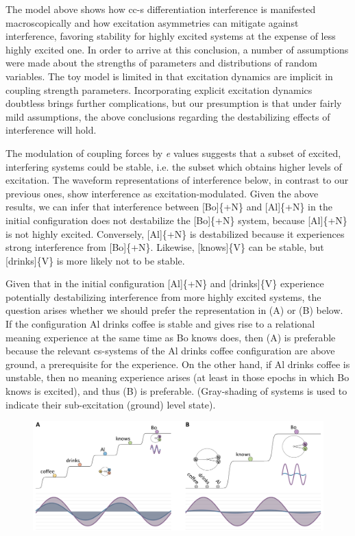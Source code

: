 The model above shows how cc-s differentiation interference is manifested macroscopically and how excitation asymmetries can mitigate against interference, favoring stability for highly excited systems at the expense of less highly excited one. In order to arrive at this conclusion, a number of assumptions were made about the strengths of parameters and distributions of random variables. The toy model is limited in that excitation dynamics are implicit in coupling strength parameters. Incorporating explicit excitation dynamics doubtless brings further complications, but our presumption is that under fairly mild assumptions, the above conclusions regarding the destabilizing effects of interference will hold.

  The modulation of coupling forces by \textit{e} values suggests that a subset of excited, interfering systems could be stable, i.e. the subset which obtains higher levels of excitation. The waveform representations of interference below, in contrast to our previous ones, show interference as excitation-modulated. Given the above results, we can infer that interference between [Bo]\{+N\} and [Al]\{+N\} in the initial configuration does not destabilize the [Bo]\{+N\} system, because [Al]\{+N\} is not highly excited. Conversely, [Al]\{+N\} is destabilized because it experiences strong interference from [Bo]\{+N\}. Likewise, [knows]\{V\} can be stable,  but [drinks]\{V\} is more likely not to be stable. 

  Given that in the initial configuration [Al]\{+N\} and [drinks]\{V\} experience potentially destabilizing interference from more highly excited systems, the question arises whether we should prefer the representation in (A) or (B) below. If the configuration {\textbar}Al drinks coffee{\textbar} is stable and gives rise to a relational meaning experience at the same time as {\textbar}Bo knows{\textbar} does, then (A) is preferable because the relevant cs-systems of the {\textbar}Al drinks coffee{\textbar} configuration are above ground, a prerequisite for the experience. On the other hand, if {\textbar}Al drinks coffee{\textbar} is unstable, then no meaning experience arises (at least in those epochs in which {\textbar}Bo knows{\textbar} is excited), and thus (B) is preferable. (Gray-shading of systems is used to indicate their sub-excitation (ground) level state).

  
\begin{figure}
\includegraphics[width=\textwidth]{figures/Tilsen-img95.png}
\caption{\missingcaption}
\label{fig:}
\end{figure}
 

